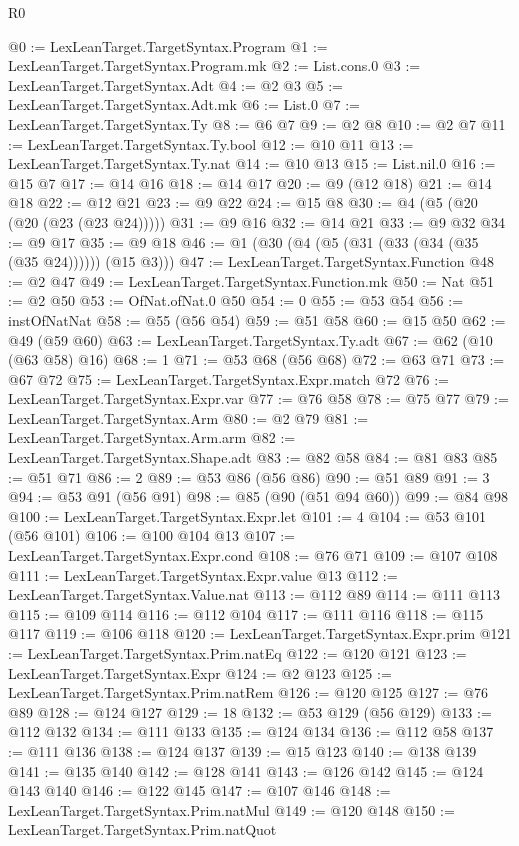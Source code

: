 \begin{lexlean}{R0}
\begin{coremodule}
@0 := LexLeanTarget.TargetSyntax.Program
@1 := LexLeanTarget.TargetSyntax.Program.mk
@2 := List.cons.{0}
@3 := LexLeanTarget.TargetSyntax.Adt
@4 := @2 @3
@5 := LexLeanTarget.TargetSyntax.Adt.mk
@6 := List.{0}
@7 := LexLeanTarget.TargetSyntax.Ty
@8 := @6 @7
@9 := @2 @8
@10 := @2 @7
@11 := LexLeanTarget.TargetSyntax.Ty.bool
@12 := @10 @11
@13 := LexLeanTarget.TargetSyntax.Ty.nat
@14 := @10 @13
@15 := List.nil.{0}
@16 := @15 @7
@17 := @14 @16
@18 := @14 @17
@20 := @9 (@12 @18)
@21 := @14 @18
@22 := @12 @21
@23 := @9 @22
@24 := @15 @8
@30 := @4 (@5 (@20 (@20 (@23 (@23 @24)))))
@31 := @9 @16
@32 := @14 @21
@33 := @9 @32
@34 := @9 @17
@35 := @9 @18
@46 := @1 (@30 (@4 (@5 (@31 (@33 (@34 (@35 (@35 @24)))))) (@15 @3)))
@47 := LexLeanTarget.TargetSyntax.Function
@48 := @2 @47
@49 := LexLeanTarget.TargetSyntax.Function.mk
@50 := Nat
@51 := @2 @50
@53 := OfNat.ofNat.{0} @50
@54 := 0
@55 := @53 @54
@56 := instOfNatNat
@58 := @55 (@56 @54)
@59 := @51 @58
@60 := @15 @50
@62 := @49 (@59 @60)
@63 := LexLeanTarget.TargetSyntax.Ty.adt
@67 := @62 (@10 (@63 @58) @16)
@68 := 1
@71 := @53 @68 (@56 @68)
@72 := @63 @71
@73 := @67 @72
@75 := LexLeanTarget.TargetSyntax.Expr.match @72
@76 := LexLeanTarget.TargetSyntax.Expr.var
@77 := @76 @58
@78 := @75 @77
@79 := LexLeanTarget.TargetSyntax.Arm
@80 := @2 @79
@81 := LexLeanTarget.TargetSyntax.Arm.arm
@82 := LexLeanTarget.TargetSyntax.Shape.adt
@83 := @82 @58
@84 := @81 @83
@85 := @51 @71
@86 := 2
@89 := @53 @86 (@56 @86)
@90 := @51 @89
@91 := 3
@94 := @53 @91 (@56 @91)
@98 := @85 (@90 (@51 @94 @60))
@99 := @84 @98
@100 := LexLeanTarget.TargetSyntax.Expr.let
@101 := 4
@104 := @53 @101 (@56 @101)
@106 := @100 @104 @13
@107 := LexLeanTarget.TargetSyntax.Expr.cond
@108 := @76 @71
@109 := @107 @108
@111 := LexLeanTarget.TargetSyntax.Expr.value @13
@112 := LexLeanTarget.TargetSyntax.Value.nat
@113 := @112 @89
@114 := @111 @113
@115 := @109 @114
@116 := @112 @104
@117 := @111 @116
@118 := @115 @117
@119 := @106 @118
@120 := LexLeanTarget.TargetSyntax.Expr.prim
@121 := LexLeanTarget.TargetSyntax.Prim.natEq
@122 := @120 @121
@123 := LexLeanTarget.TargetSyntax.Expr
@124 := @2 @123
@125 := LexLeanTarget.TargetSyntax.Prim.natRem
@126 := @120 @125
@127 := @76 @89
@128 := @124 @127
@129 := 18
@132 := @53 @129 (@56 @129)
@133 := @112 @132
@134 := @111 @133
@135 := @124 @134
@136 := @112 @58
@137 := @111 @136
@138 := @124 @137
@139 := @15 @123
@140 := @138 @139
@141 := @135 @140
@142 := @128 @141
@143 := @126 @142
@145 := @124 @143 @140
@146 := @122 @145
@147 := @107 @146
@148 := LexLeanTarget.TargetSyntax.Prim.natMul
@149 := @120 @148
@150 := LexLeanTarget.TargetSyntax.Prim.natQuot

\end{coremodule}
\end{lexlean}
